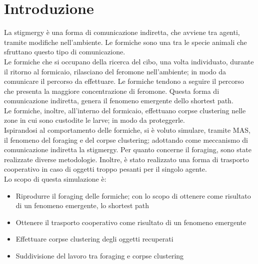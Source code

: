 \documentclass[12pt,a4paper,openright,twoside]{report}
\begin{document}
	\chapter*{Introduzione}                 %

La stigmergy è una forma di comunicazione indiretta, che avviene tra agenti, tramite modifiche nell'ambiente. Le formiche sono una tra le specie animali che sfruttano questo tipo di comunicazione.\\
Le formiche che si occupano della ricerca del cibo, una volta individuato, durante il ritorno al formicaio, rilasciano del feromone nell'ambiente; in modo da comunicare il percorso da effettuare. Le formiche tendono a seguire il percorso che presenta la maggiore concentrazione di feromone. Questa forma di comunicazione indiretta, genera il fenomeno emergente dello shortest path.\\
Le formiche, inoltre, all'interno del formicaio, effettuano corpse clustering nelle zone in cui sono custodite le larve; in modo da proteggerle.\\
Ispirandosi al comportamento delle formiche, si è voluto simulare, tramite MAS, il fenomeno del foraging e del corpse clustering; adottando come meccanismo di comunicazione indiretta la stigmergy. Per quanto concerne il foraging, sono state realizzate diverse metodologie. Inoltre, è stato realizzato una forma di trasporto cooperativo in caso di oggetti troppo pesanti per il singolo agente.\\
Lo scopo di questa simulazione è:

\begin{itemize}
	\item Riprodurre il foraging delle formiche; con lo scopo di ottenere come risultato di un fenomeno emergente, lo shortest path
	\item Ottenere il trasporto cooperativo come risultato di un fenomeno emergente
	\item Effettuare corpse clustering degli oggetti recuperati
	\item Suddivisione del lavoro tra foraging e corpse clustering
\end{itemize}
\end{document}
